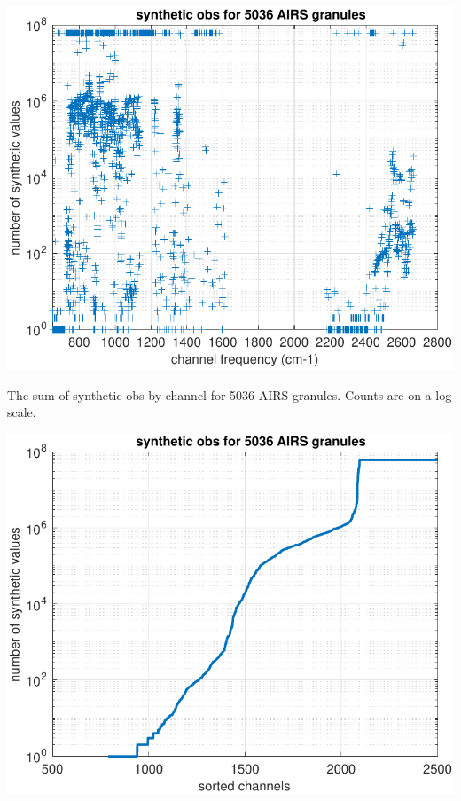 \documentclass[12pt]{article}
\begin{document}
  \begin{centering}
  \includegraphics[width=\textwidth]{figures/synth_obs_freq_order.pdf}
  \end{centering}\vspace{3mm}

The sum of synthetic obs by channel for 5036 AIRS granules.
Counts are on a log scale.

  \begin{centering}
  \includegraphics[width=\textwidth]{figures/synthetic_obs_counts.pdf}
  \end{centering}\vspace{3mm}
\end{document}
